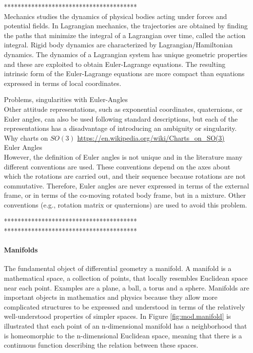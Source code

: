 ***************************************\\
Mechanics studies the dynamics of physical bodies acting under forces and potential fields. 
In Lagrangian mechanics, the trajectories are obtained by finding the paths that minimize the integral of a Lagrangian over time, called the action integral. 
Rigid body dynamics are characterized by Lagrangian/Hamiltonian dynamics. The dynamics of a Lagrangian system has unique geometric properties and these are exploited to obtain Euler-Lagrange equations. The resulting intrinsic form of the Euler-Lagrange equations are more compact than equations expressed in terms of local coordinates.


Problems, singularities with Euler-Angles\\
Other attitude representations, such as exponential coordinates, quaternions, or Euler
angles, can also be used following standard descriptions, but each of the representations has a disadvantage
of introducing an ambiguity or singularity.
Why charts on $ SO(3) $ \url{https://en.wikipedia.org/wiki/Charts_on_SO(3)}\\

Euler Angles\\
However, the definition of Euler angles is not unique and in the literature many different conventions are used. These conventions depend on the axes about which the rotations are carried out, and their sequence because rotations are not commutative. Therefore, Euler angles are never expressed in terms of the external frame, or in terms of the co-moving rotated body frame, but in a mixture. Other conventions (e.g., rotation matrix or quaternions) are used to avoid this problem.

***************************************\\

***************************************\\

\paragraph{Manifolds}
The fundamental object of differential geometry a manifold. A manifold is a mathematical space, a collection of points, that locally resembles Euclidean space near each point. Examples are a plane, a ball, a torus and a sphere. Manifolds are important objects in mathematics and physics because they allow more complicated structures to be expressed and understood in terms of the relatively well-understood properties of simpler spaces. In Figure \ref{fig:mod.manifold} is illustrated that each point of an n-dimensional manifold has a neighborhood that is homeomorphic to the n-dimensional Euclidean space, meaning that there is a continuous function describing the relation between these spaces.

